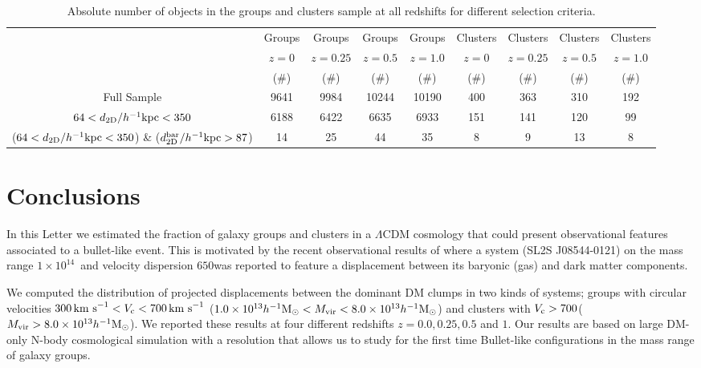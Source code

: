 \documentclass{emulateapj}
\newcommand{\hkpc}{{\ifmmode{h^{-1}{\rm kpc}}\else{$h^{-1}$kpc }\fi}}
\newcommand{\hMsun}{{\ifmmode{h^{-1}{\rm {M_{\odot}}}}\else{$h^{-1}{\rm{M_{\odot}}}$}\fi}}
\newcommand{\kms}{{\ifmmode{{\mathrm{\,km\ s}^{-1}}}\else{\,km~s$^{-1}$}\fi}}
\newcommand{\bullg}{SL2S J08544-0121}
\begin{document}
  
\begin{table}
\begin{center}
\begin{tabular}{ccccccccc}\hline\hline
        & Groups & Groups & Groups & Groups & Clusters & Clusters & Clusters & Clusters\\
  & $z=0$   & $z=0.25$   & $z=0.5$   & $z=1.0$   & $z=0$   & $z=0.25$   & $z=0.5$   & $z=1.0$ \\
  & ($\# $)    & ($\# $)    & ($\# $)    & ($\# $)    & ($\# $)    & ($\# $)    & ($\# $)    & ($\# $)  \\\hline
Full Sample & 9641 & 9984 & 10244 & 10190 & 400  & 363 & 310 & 192 \\
$64 <d_{\rm 2D}/\hkpc< 350$ & 6188 & 6422 & 6635 & 6933 & 151 &
141 & 120 & 99\\
($64 <d_{\rm 2D}/\hkpc< 350 $) \& ($d_{\rm 2D}^{\rm bar}/\hkpc >87$) & 14 & 25 & 44 & 35 & 8 & 9 & 13 & 8 \\\hline\hline
\end{tabular}
\caption{Absolute number of objects in the groups and clusters sample
  at all redshifts for different selection criteria. }
\label{table:numbers}
\end{center}
\end{table}





\section{Conclusions}
\label{sec:conclusions}

In this Letter we estimated the fraction of galaxy groups and clusters
in a $\Lambda$CDM cosmology that could present observational features
associated to a bullet-like event. This is motivated by the recent
observational results of \citep{Gastaldello} where a system (\bullg)
on the mass range $1\times 10^{14}$\hMsun\ and velocity dispersion
$650$\kms was reported to feature a displacement between its baryonic
(gas) and dark matter components. 

We computed the distribution of projected displacements
between the dominant DM clumps in two kinds of systems; groups with
circular velocities $300\kms<V_{\rm c}<700\kms$ ($1.0\times
10^{13}\hMsun < M_{\rm vir}<8.0\times 10^{13}\hMsun$) and clusters with $V_{\rm
  c}>700$\kms ($M_{\rm vir}>8.0\times 10^{13}\hMsun$). We reported these
results at four different redshifts $z=0.0,0.25,0.5$ and $1$. Our
results are based on large DM-only N-body cosmological simulation with
a resolution that allows us to study for the first time Bullet-like
configurations in the mass range of galaxy groups. 
\end{document}
